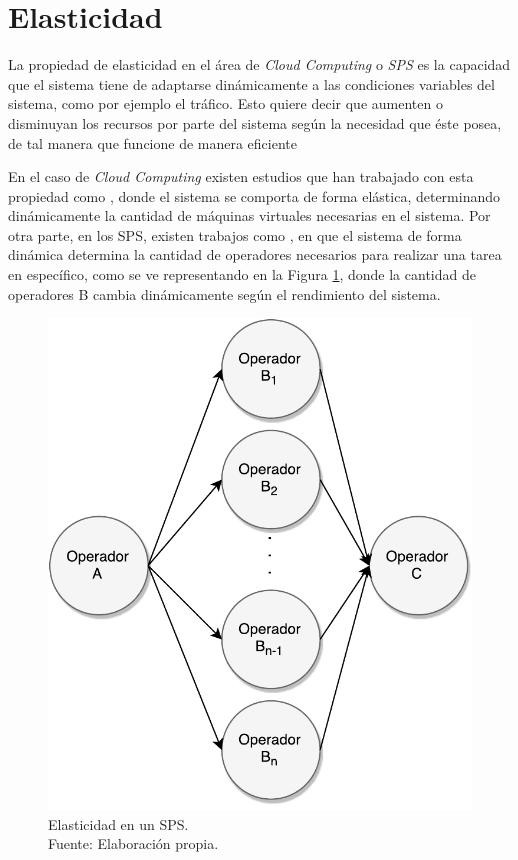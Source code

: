 \section{Elasticidad}
\label{sec:elasticidad}

La propiedad de elasticidad en el \'area de \textit{Cloud Computing} o \textit{SPS} es la capacidad que el sistema tiene de adaptarse din\'amicamente a las condiciones variables del sistema, como por ejemplo el tr\'afico. \normalsize{Esto quiere decir que aumenten o disminuyan los recursos por parte del sistema seg\'un la necesidad que \'este posea, de tal manera que funcione de manera eficiente} \citep{kelly2014elasticity}

En el caso de \textit{Cloud Computing} existen estudios que han trabajado con esta propiedad como \citep{GongGW10, NguyenSGSW13, LehrigEB15}, donde el sistema se comporta de forma el\'astica, determinando din\'amicamente la cantidad de m\'aquinas virtuales necesarias en el sistema. Por otra parte, en los SPS, existen trabajos como \citep{GedikSHW14, IshiiS11, SchneiderAGBW09, MadsenTZ14, GulisanoJPSV12}, en que el sistema de forma din\'amica determina la cantidad de operadores necesarios para realizar una tarea en espec\'ifico, como se ve representando en la Figura \ref{fig:elasticidad}, donde la cantidad de operadores B cambia din\'amicamente seg\'un el rendimiento del sistema.

\begin{figure}[!ht]
	\centering
	\includegraphics[scale=0.55]{images/Elasticidad.pdf}
	\caption[Elasticidad en un SPS.]{Elasticidad en un SPS.\\Fuente: Elaboraci\'on propia.}
	\label{fig:elasticidad}
\end{figure}

